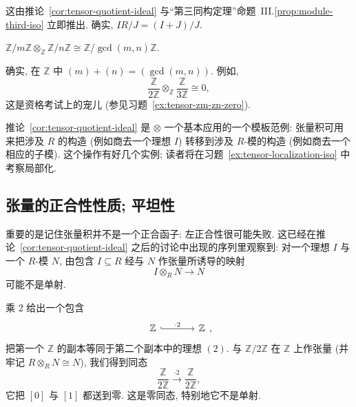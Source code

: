 这由推论~\ref{cor:tensor-quotient-ideal} 与``第三同构定理''命题~III.\ref{prop:module-third-iso} 立即推出. 确实, $IR/J=(I+J)/J$.

\begin{example}\label{ex:tensor-zm-zn}
$\mathbb{Z}/m\mathbb{Z}\otimes_{\mathbb{Z}}\mathbb{Z}/n\mathbb{Z}\cong\mathbb{Z}/\gcd(m,n)\mathbb{Z}$.

确实, 在 $\mathbb{Z}$ 中 $(m)+(n)=(\gcd(m,n))$. 例如,
\[
\frac{\mathbb{Z}}{2\mathbb{Z}}\otimes_{\mathbb{Z}}\frac{\mathbb{Z}}{3\mathbb{Z}}\cong 0,
\]
这是资格考试上的宠儿 (参见习题~\ref{ex:tensor-zm-zn-zero}).
\end{example}

推论~\ref{cor:tensor-quotient-ideal} 是 $\otimes$ 一个基本应用的一个模板范例: 张量积可用来把涉及 $R$ 的构造 (例如商去一个理想 $I$) 转移到涉及 $R$-模的构造 (例如商去一个相应的子模). 这个操作有好几个实例; 读者将在习题~\ref{ex:tensor-localization-iso} 中考察局部化.

\subsection{张量的正合性性质; 平坦性}
\label{subsec:tensor-flatness}

重要的是记住张量积并不是一个正合函子: 左正合性很可能失败. 这已经在推论~\ref{cor:tensor-quotient-ideal} 之后的讨论中出现的序列里观察到: 对一个理想 $I$ 与一个 $R$-模 $N$, 由包含 $I\subseteq R$ 经与 $N$ 作张量所诱导的映射
\[
I\otimes_R N\to N
\]
可能不是单射.

\begin{example}\label{ex:tensor-mult-inj}
乘 2 给出一个包含
\[
\begin{tikzcd}[column sep=large]\mathbb Z \ar[r,hook,"\cdot2"] & \mathbb Z\end{tikzcd},
\]
把第一个 $\mathbb{Z}$ 的副本等同于第二个副本中的理想 $(2)$. 与 $\mathbb{Z}/2\mathbb{Z}$ 在 $\mathbb{Z}$ 上作张量 (并牢记 $R\otimes_R N\cong N$), 我们得到同态
\[
\frac{\mathbb{Z}}{2\mathbb{Z}}\xrightarrow{\cdot 2}\frac{\mathbb{Z}}{2\mathbb{Z}},
\]
它把 $[0]$ 与 $[1]$ 都送到零. 这是零同态, 特别地它不是单射.
\end{example}

